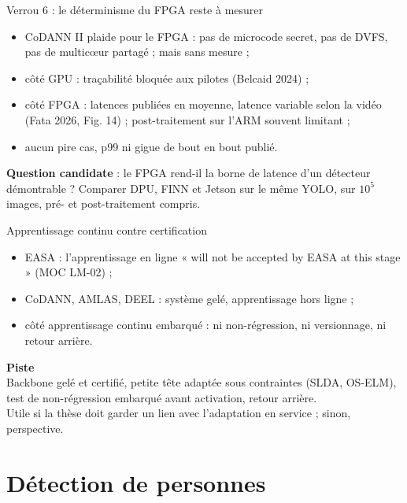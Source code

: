 \documentclass[aspectratio=169,11pt]{beamer}
\newcommand{\prop}{\hfill{\scriptsize\color{acc}\fbox{proposition}}}
\begin{document}
\begin{frame}{Verrou 6 : le déterminisme du FPGA reste à mesurer}
  \begin{itemize}
    \item CoDANN II plaide pour le FPGA : pas de microcode secret, pas de DVFS, pas de
          multicœur partagé ; mais sans mesure ;
    \item côté GPU : traçabilité bloquée aux pilotes (Belcaid 2024) ;
    \item côté FPGA : latences publiées en moyenne, latence variable selon la vidéo
          (Fata 2026, Fig. 14) ; post-traitement sur l'ARM souvent limitant ;
    \item aucun pire cas, p99 ni gigue de bout en bout publié.
  \end{itemize}

  \vspace{0.6em}
  \textbf{Question candidate} : le FPGA rend-il la borne de latence d'un détecteur
  \alert{démontrable} ? Comparer DPU, FINN et Jetson sur le même YOLO, sur $10^5$ images,
  pré- et post-traitement compris.
\end{frame}

\begin{frame}{Apprentissage continu contre certification}
  \begin{itemize}
    \item EASA : l'apprentissage en ligne « will not be accepted by EASA at this stage »
          (MOC LM-02) ;
    \item CoDANN, AMLAS, DEEL : système gelé, apprentissage hors ligne ;
    \item côté apprentissage continu embarqué : ni non-régression, ni versionnage, ni retour
          arrière.
  \end{itemize}

  \vspace{0.6em}
  \textbf{Piste} \prop\\
  Backbone gelé et certifié, petite tête adaptée sous contraintes (SLDA, OS-ELM), test de
  non-régression embarqué avant activation, retour arrière. \\
  {\small Utile si la thèse doit garder un lien avec l'adaptation en service ; sinon,
  perspective.}
\end{frame}

\section{Détection de personnes}
\end{document}

